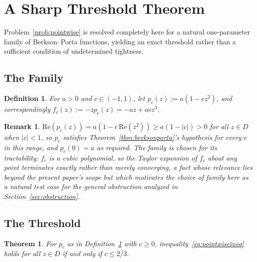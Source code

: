 \documentclass[pdflatex,sn-mathphys-num]{sn-jnl}%
\theoremstyle{thmstyleone}%
\newtheorem{theorem}{Theorem}%
\theoremstyle{thmstyletwo}%
\newtheorem{remark}{Remark}%
\theoremstyle{thmstylethree}%
\newtheorem{definition}{Definition}%
\begin{document}
\section{A Sharp Threshold Theorem}
\label{sec:threshold}

Problem~\ref{prob:pointwise} is resolved completely here for a natural one-parameter family of Berkson--Porta functions, yielding an exact threshold rather than a sufficient condition of undetermined tightness.

\subsection{The Family}

\begin{definition}
\label{def:family}
For $a>0$ and $c\in(-1,1)$, let $p_c(z):=a(1-cz^2)$, and correspondingly $f_c(z):=-zp_c(z)=-az+acz^3$.
\end{definition}

\begin{remark}
$\mathrm{Re}(p_c(z))=a(1-c\,\mathrm{Re}(z^2))\ge a(1-|c|)>0$ for all $z\in D$ when $|c|<1$, so $p_c$ satisfies Theorem~\ref{thm:berksonporta}'s hypothesis for every $c$ in this range, and $p_c(0)=a$ as required. The family is chosen for its tractability: $f_c$ is a cubic polynomial, so the Taylor expansion of $f_c$ about any point terminates exactly rather than merely converging, a fact whose relevance lies beyond the present paper's scope but which motivates the choice of family here as a natural test case for the general obstruction analyzed in Section~\ref{sec:obstruction}.
\end{remark}

\subsection{The Threshold}

\begin{theorem}
\label{thm:threshold}
For $p_c$ as in Definition~\ref{def:family} with $c\ge0$, inequality~\eqref{eq:pointwiseineq} holds for all $z\in D$ if and only if $c\le2/3$.
\end{theorem}
\end{document}
